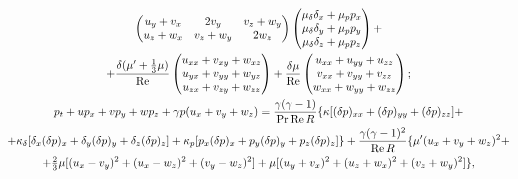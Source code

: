 \begin{gather*}
\begin{pmatrix}
u_y+v_x & 2v_y & v_z+w_y\\


u_z+w_x & v_z+w_y & 2w_z\\


\end{pmatrix}


\begin{pmatrix}


\mu_\delta\delta_x+\mu_p p_x\\


\mu_\delta\delta_y+\mu_p p_y\\


\mu_\delta\delta_z+\mu_p p_z


\end{pmatrix}


+\\


%


+\frac{\delta(\mu'+\frac{1}{3}\mu)}{\re}


\begin{pmatrix}


u_{xx}+v_{xy}+w_{xz}\\


u_{yx}+v_{yy}+w_{yz}\\


u_{zx}+v_{zy}+w_{zz}


\end{pmatrix}


+\frac{\delta\mu}{\re}


\begin{pmatrix}


u_{xx}+u_{yy}+u_{zz}\\


v_{xx}+v_{yy}+v_{zz}\\


w_{xx}+w_{yy}+w_{zz}


\end{pmatrix}


;\\


%


p_t+up_x+vp_y+wp_z+\gamma p(u_x+v_y+w_z)=


\frac{\gamma(\gamma-1)}{\Pro\re R}\{\kappa


[(\delta p)_{xx}+(\delta p)_{yy}+(\delta p)_{zz}]+\\


%


+\kappa_\delta


[\delta_x(\delta p)_x+\delta_y(\delta p)_y+\delta_z(\delta p)_z]+


\kappa_p


[p_x(\delta p)_x+p_y(\delta p)_y+p_z(\delta p)_z]\}+


\frac{\gamma(\gamma-1)^2}{\re R}


\{\mu' (u_x+v_y+w_z)^2+\\


%


+\tfrac{2}{3}\mu[(u_x-v_y)^2+(u_x-w_z)^2+(v_y-w_z)^2]+


\mu[(u_y+v_x)^2+(u_z+w_x)^2+(v_z+w_y)^2]\},


\end{gather*}


